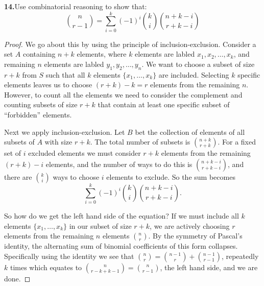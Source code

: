 \documentclass[12pt]{amsart}
\begin{document}
\begin{onehalfspace}
        \noindent\textbf{14.}Use combinatorial reasoning to show that:
        \begin{displaymath}
            \binom{n}{r-1} = \sum_{i=0}^k (-1)^i\binom{k}{i}\binom{n + k - i}{r + k - i}
        \end{displaymath}
        \begin{proof}
            We go about this by using the principle of inclusion-exclusion.
            Consider a set $A$ containing $n+k$ elements, where $k$ elements are labled $x_1,x_2,\ldots,x_k$,
            and remaining $n$ elements are labled $y_1,y_2,\ldots,y_n$.
            We want to choose a subset of size $r+k$ from $S$ such that all $k$ elements $\{x_1,\ldots,x_k\}$
            are included.
            Selecting $k$ specific elements leaves us to choose $(r+k)-k=r$ elements from the remaining $n$.
            However, to count all the elements we need to consider the complement and counting subsets of
            size $r+k$ that contain at least one specific subset of ``forbidden'' elements.

            Next we apply inclusion-exclusion.
            Let $B$ bet the collection of elements of all subsets of $A$ with size $r+k$.
            The total number of subsets is $\binom{n+k}{r+k}$.
            For a fixed set of $i$ excluded elements we must consider $r+k$ elements from the remaining
            $(r+k)-i$ elements, and the number of ways to do this is $\binom{n+k-i}{r+k-i}$, and there
            are $\binom{k}{i}$ ways to choose $i$ elements to exclude.
            So the sum becomes
            \begin{displaymath}
                \sum_{i=0}^k (-1)^i\binom{k}{i}\binom{n+k-i}{r+k-i}.
            \end{displaymath}

            So how do we get the left hand side of the equation?
            If we must include all $k$ elements $\{x_1,\ldots,x_k\}$ in our subset of size $r+k$,
            we are actively choosing $r$ elements from the remaining $n$ elements $\binom{n}{r}$.
            By the symmetry of Pascal's identity, the alternating sum of binomial coefficients
            of this form collapses.
            Specifically using the identity we see that $\binom{n}{r} = \binom{n-1}{r} + \binom{n-1}{r-1}$,
            repeatedly $k$ times which equates to $\binom{n}{r-k+k-1}=\binom{n}{r-1}$, the left hand side,
            and we are done.
        \end{proof}


\end{onehalfspace}
\end{document}
